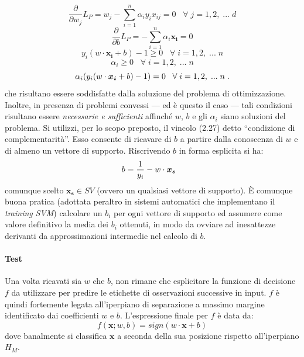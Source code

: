 \begin{equation}
	\frac{\partial}{\partial w_j} L_P = w_j - \sum\limits_{i = 1}^{n} {\alpha_i y_i x_{ij}} = 0 \;\;\; \forall \; j = 1, 2, \;...\; d
\end{equation}
\begin{equation}
	\frac{\partial}{\partial b} L_P = - \sum\limits_{i = 1}^{n} {\alpha_i \boldsymbol{x_i}} = 0
\end{equation}
\begin{equation}
	y_i(w \cdot \boldsymbol{x_i} + b) - 1 \geq 0 \;\;\; \forall \; i = 1, 2, \;...\; n
\end{equation}
\begin{equation}
	\alpha_i \geq 0 \;\;\; \forall \; i = 1, 2, \;...\; n\end{equation}
\begin{equation}
	\alpha_i(y_i(w \cdot \boldsymbol{x_i} + b) - 1) = 0 \;\;\; \forall \; i = 1, 2, \;...\; n \;.
\vspace{2mm}
\end{equation}
che risultano essere soddisfatte dalla soluzione del problema di ottimizzazione. Inoltre, in presenza di problemi convessi --- ed è questo il caso --- tali condizioni risultano essere \textit{necessarie e sufficienti} affinché $w$, $b$ e gli $\alpha_i$ siano soluzioni del problema.
Si utilizzi, per lo scopo preposto, il vincolo (2.27) detto ``condizione di complementarità''. Esso consente di ricavare di $b$ a partire dalla conoscenza di $w$ e di almeno un vettore di supporto. Riscrivendo $b$ in forma esplicita si ha:
\begin{equation}
	b = \frac{1}{y_i} - w \cdot \boldsymbol{x_s} \;\;\; 
\vspace{2mm}
\end{equation}
comunque scelto $\boldsymbol{x_s} \in SV$ (ovvero un qualsiasi vettore di supporto).
È comunque buona pratica (adottata peraltro in sistemi automatici che implementano il \textit{training} \textit{SVM}) calcolare un $b_i$ per ogni vettore di supporto ed assumere come valore definitivo la media dei $b_i$ ottenuti, in modo da ovviare ad inesattezze derivanti da approssimazioni intermedie nel calcolo di $b$.

\paragraph{Test}
Una volta ricavati sia $w$ che $b$, non rimane che esplicitare la funzione di decisione $f$ da utilizzare per predire le etichette di osservazioni successive in input. $f$ è quindi fortemente legata all'iperpiano di separazione a massimo margine identificato dai coefficienti $w$ e $b$. L'espressione finale per $f$ è data da:
\begin{equation}
	f(\boldsymbol{x}; w, b) = sign(w \cdot \boldsymbol{x} + b)
\end{equation}
dove banalmente si classifica $\boldsymbol{x}$ a seconda della sua posizione rispetto all'iperpiano $H_M$.

